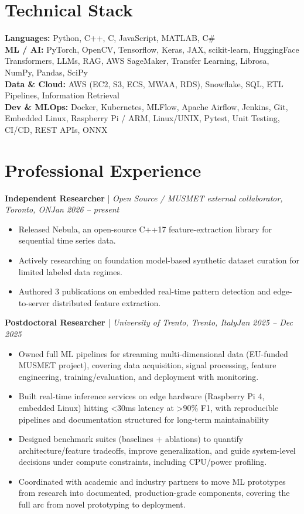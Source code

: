 \documentclass[11pt]{article}
\newenvironment{cvrole}[5]{%
  \par\noindent\textbf{\large #1} | \textit{\small #2, #3}\hfill \textit{\small #4 -- #5}\par
  \begin{itemize}[leftmargin=2em, itemsep=-0.3em, topsep=-0.5em]%
}{%
  \end{itemize}\par\noindent\mbox{}\par\vspace{0.1em}%
}
\begin{document}
\section*{Technical Stack}
\textbf{Languages:} Python, C++, C, JavaScript, MATLAB, C\#\\
\textbf{ML / AI:} PyTorch, OpenCV, Tensorflow, Keras, JAX, scikit-learn, HuggingFace Transformers, LLMs, RAG, AWS SageMaker, Transfer Learning, Librosa, NumPy, Pandas, SciPy\\
\textbf{Data \& Cloud:} AWS (EC2, S3, ECS, MWAA, RDS), Snowflake, SQL, ETL Pipelines, Information Retrieval\\
\textbf{Dev \& MLOps:} Docker, Kubernetes, MLFlow, Apache Airflow, Jenkins, Git, Embedded Linux, Raspberry Pi / ARM, Linux/UNIX, Pytest, Unit Testing, CI/CD, REST APIs, ONNX

\section*{Professional Experience}
\begin{cvrole}{Independent Researcher}{Open Source / MUSMET external collaborator}{Toronto, ON}{Jan 2026}{present}
    \item Released Nebula, an open-source C++17 feature-extraction library for sequential time series data.
    \item Actively researching on foundation model-based synthetic dataset curation for limited labeled data regimes.
    \item Authored 3 publications on embedded real-time pattern detection and edge-to-server distributed feature extraction.
\end{cvrole}

\begin{cvrole}{Postdoctoral Researcher}{University of Trento}{Trento, Italy}{Jan 2025}{Dec 2025}
    \item Owned full ML pipelines for streaming multi-dimensional data (EU-funded MUSMET project), covering data acquisition, signal processing, feature engineering, training/evaluation, and deployment with monitoring.
    \item Built real-time inference services on edge hardware (Raspberry Pi 4, embedded Linux) hitting <30ms latency at >90\% F1, with reproducible pipelines and documentation structured for long-term maintainability
    \item Designed benchmark suites (baselines + ablations) to quantify architecture/feature tradeoffs, improve generalization, and guide system-level decisions under compute constraints, including CPU/power profiling.
    \item Coordinated with academic and industry partners to move ML prototypes from research into documented, production-grade components, covering the full arc from novel prototyping to deployment.
\end{cvrole}
\end{document}

